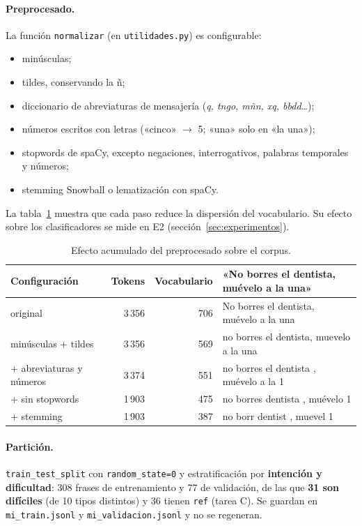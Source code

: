 \documentclass[10pt,a4paper]{article}
\newcommand{\cod}[1]{\texttt{#1}}
\begin{document}
\paragraph{Preprocesado.} La función \cod{normalizar} (en \cod{utilidades.py}) es configurable:
\begin{itemize}
  \item minúsculas;
  \item tildes, conservando la ñ;
  \item diccionario de abreviaturas de mensajería (\textit{q, tngo, mñn, xq, bbdd}\dots);
  \item números escritos con letras («cinco» $\rightarrow$ 5; «una» solo en «la una»);
  \item stopwords de spaCy, excepto negaciones, interrogativos, palabras temporales y números;
  \item stemming Snowball o lematización con spaCy.
\end{itemize}
La tabla~\ref{tab:prepro} muestra que cada paso reduce la dispersión del vocabulario. Su efecto sobre los clasificadores se mide en E2 (sección~\ref{sec:experimentos}).

\begin{table}[h]
  \centering\small
  \begin{tabular}{@{}lrrl@{}}
    \toprule
    Configuración & Tokens & Vocabulario & «No borres el dentista, muévelo a la una» \\
    \midrule
    original                 & 3\,356 & 706 & No borres el dentista, muévelo a la una \\
    minúsculas + tildes      & 3\,356 & 569 & no borres el dentista, muevelo a la una \\
    + abreviaturas y números & 3\,374 & 551 & no borres el dentista , muévelo a la 1 \\
    + sin stopwords          & 1\,903 & 475 & no borres dentista , muévelo 1 \\
    + stemming               & 1\,903 & 387 & no borr dentist , muevel 1 \\
    \bottomrule
  \end{tabular}
  \caption{Efecto acumulado del preprocesado sobre el corpus.}
  \label{tab:prepro}
\end{table}

\paragraph{Partición.} \cod{train\_test\_split} con \cod{random\_state=0} y estratificación por \textbf{intención y dificultad}: 308 frases de entrenamiento y 77 de validación, de las que \textbf{31 son difíciles} (de 10 tipos distintos) y 36 tienen \cod{ref} (tarea C). Se guardan en \cod{mi\_train.jsonl} y \cod{mi\_validacion.jsonl} y no se regeneran.
\end{document}
